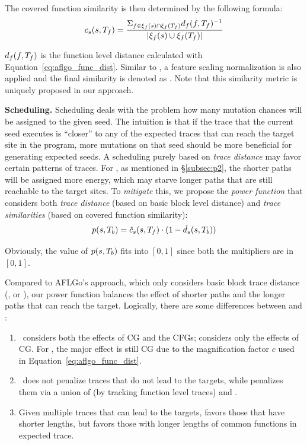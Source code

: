 The covered function similarity is then determined by the following formula:
\begin{equation}
c_s(s, T_f) = \frac{\Sigma_{f\in\xi_f(s)	\cap\xi_f(T_f)}d_f(f,T_f)^{-1}}{|\xi_f(s)\cup\xi_f(T_f)|}
\end{equation}

$d_f(f,T_f)$ is the function level distance calculated with Equation~\ref{eq:aflgo_func_dist}. Similar to \traceDistn, a feature scaling normalization is also applied and the final similarity is denoted as \covDistnN. Note that this similarity metric is uniquely proposed in our approach.

\textbf{Scheduling.}
Scheduling deals with the problem how many mutation chances will be assigned to the given seed. The intuition is that if the trace that the current seed executes is ``closer'' to any of the expected traces that can reach the target site in the program, more mutations on that seed should be more beneficial for generating expected seeds. A scheduling purely based on \emph{trace distance} may favor certain patterns of traces. For \aflgo, as mentioned in \S\ref{subsec:p2}, the shorter paths will be assigned more energy, which may starve longer paths that are still reachable to the target sites. To \emph{mitigate} this, we propose the \emph{power function} that considers both \emph{trace distance} (based on basic block level distance) and \emph{trace similarities} (based on covered function similarity): 
\begin{equation}\label{eq:aflgo_power}
p(s, T_b) = \tilde{c}_{s}(s, T_f)\cdot(1 - \tilde{d}_s(s,T_b))
\end{equation}

Obviously, the value of $p(s, T_b)$ fits into $[0,1]$ since both the multipliers are in $[0,1]$.

Compared to AFLGo's approach, which only considers basic block trace distance (\traceDistn, or \traceDistnFinal), our power function balances the effect of shorter paths and the longer paths that can reach the target. Logically, there are some differences between {\covDistn} and {\traceDistn}:
\begin{enumerate}[(1)]
    \item \traceDistn~considers both the effects of CG and the CFGs; {\covDistn} considers only the effects of CG. For \traceDistn, the major effect is still CG due to the magnification factor $c$ used in Equation~\ref{eq:aflgo_func_dist}.
    \item \traceDistn~does not penalize traces that do not lead to the targets, while {\covDistn} penalizes them via a union of  (by tracking function level traces) and \fntrace{\tgtfnset}.
    \item Given multiple traces that can lead to the targets, {\traceDistn} favors those that have shorter lengths, but {\covDistn} favors those with longer lengths of common functions in expected trace.
\end{enumerate}

